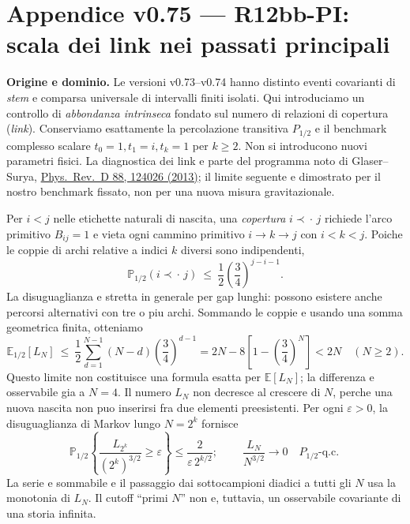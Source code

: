 \documentclass[11pt,a4paper]{article}
\begin{document}
\clearpage
\section*{Appendice v0.75 --- R12bb-PI: scala dei link nei passati principali}
\textbf{Origine e dominio.} Le versioni v0.73--v0.74 hanno distinto eventi covarianti di \emph{stem} e comparsa universale di intervalli finiti isolati. Qui introduciamo un controllo di \emph{abbondanza intrinseca} fondato sul numero di relazioni di copertura (\emph{link}). Conserviamo esattamente la percolazione transitiva $P_{1/2}$ e il benchmark complesso scalare $t_0=1,t_1=i,t_k=1$ per $k\ge2$. Non si introducono nuovi parametri fisici. La diagnostica dei link e parte del programma noto di Glaser--Surya, \href{https://doi.org/10.1103/PhysRevD.88.124026}{Phys.~Rev.~D 88, 124026 (2013)}; il limite seguente e dimostrato per il nostro benchmark fissato, non per una nuova misura gravitazionale.

Per $i<j$ nelle etichette naturali di nascita, una \emph{copertura} $i\prec\!\cdot\,j$ richiede l'arco primitivo $B_{ij}=1$ e vieta ogni cammino primitivo $i\to k\to j$ con $i<k<j$. Poiche le coppie di archi relative a indici $k$ diversi sono indipendenti,
\begin{equation}
\mathbb P_{1/2}(i\prec\!\cdot\,j)\ \le\ \frac12\left(\frac34\right)^{j-i-1}.
\tag{PI.1}
\end{equation}
La disuguaglianza e stretta in generale per gap lunghi: possono esistere anche percorsi alternativi con tre o piu archi. Sommando le coppie e usando una somma geometrica finita, otteniamo
\begin{equation}
\boxed{\displaystyle \mathbb E_{1/2}[L_N]\ \le\ \frac12\sum_{d=1}^{N-1}(N-d)\left(\frac34\right)^{d-1}
=2N-8\left[1-\left(\frac34\right)^N\right]<2N\quad(N\ge2).}
\tag{PI.2}
\end{equation}
Questo limite non costituisce una formula esatta per $\mathbb E[L_N]$; la differenza e osservabile gia a $N=4$. Il numero $L_N$ non decresce al crescere di $N$, perche una nuova nascita non puo inserirsi fra due elementi preesistenti. Per ogni $\varepsilon>0$, la disuguaglianza di Markov lungo $N=2^k$ fornisce
\begin{equation}
\mathbb P_{1/2}\left\{\frac{L_{2^k}}{(2^k)^{3/2}}\ge\varepsilon\right\}
\le\frac{2}{\varepsilon\,2^{k/2}};\qquad
\boxed{\ \frac{L_N}{N^{3/2}}\longrightarrow0\quad P_{1/2}\text{-q.c.}\ }
\tag{PI.3}
\end{equation}
La serie e sommabile e il passaggio dai sottocampioni diadici a tutti gli $N$ usa la monotonia di $L_N$. Il cutoff ``primi $N$'' non e, tuttavia, un osservabile covariante di una storia infinita.
\end{document}
